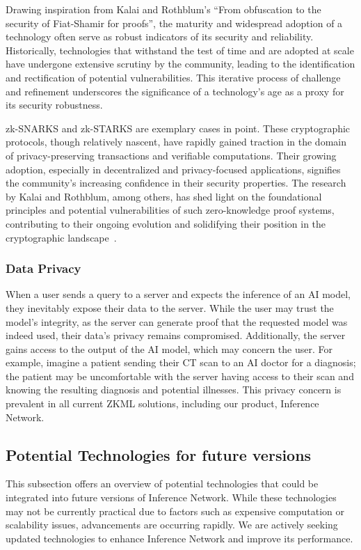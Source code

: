 \documentclass[conference]{IEEEtran}
\begin{document}
Drawing inspiration from Kalai and Rothblum’s “From obfuscation to the security of Fiat-Shamir for proofs”, the maturity and widespread adoption of a technology often serve as robust indicators of its security and reliability. Historically, technologies that withstand the test of time and are adopted at scale have undergone extensive scrutiny by the community, leading to the identiﬁcation and rectiﬁcation of potential vulnerabilities. This iterative process of challenge and reﬁnement underscores the signiﬁcance of a technology’s age as a proxy for its security robustness.


zk-SNARKS and zk-STARKS are exemplary cases in point. These cryptographic protocols, though relatively nascent, have rapidly gained traction in the domain of privacy-preserving transactions and veriﬁable computations. Their growing adoption, especially in decentralized and privacy-focused applications, signiﬁes the community’s increasing conﬁdence in their security properties. The research by Kalai and Rothblum, among others, has shed light on the foundational principles and potential vulnerabilities of such zero-knowledge proof systems, contributing to their ongoing evolution and solidifying their position in the cryptographic landscape~\cite{Kalai2017FromOT}.

\subsubsection{Data Privacy}

When a user sends a query to a server and expects the inference of an AI model, they inevitably expose their data to the server. While the user may trust the model's integrity, as the server can generate proof that the requested model was indeed used, their data's privacy remains compromised. Additionally, the server gains access to the output of the AI model, which may concern the user. For example, imagine a patient sending their CT scan to an AI doctor for a diagnosis; the patient may be uncomfortable with the server having access to their scan and knowing the resulting diagnosis and potential illnesses. This privacy concern is prevalent in all current ZKML solutions, including our product, Inference Network.


\subsection{Potential Technologies for future versions}

This subsection offers an overview of potential technologies that could be integrated into future versions of Inference Network. While these technologies may not be currently practical due to factors such as expensive computation or scalability issues, advancements are occurring rapidly. We are actively seeking updated technologies to enhance Inference Network and improve its performance.
\end{document}
